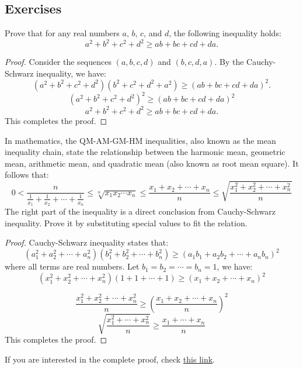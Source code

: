 \documentclass[
	12pt, %
	fleqn, %
	a4paper, %
]{LegrandOrangeBook}
\begin{document}
\subsection{Exercises}
\begin{exercise}
    Prove that for any real numbers \( a \), \( b \), \( c \), and \( d \), the following inequality holds:
    \[
    a^2 + b^2 + c^2 + d^2 \geq ab + bc + cd + da.
    \]
\end{exercise}
\begin{proof}
    Consider the sequences \( (a, b, c, d) \) and \( (b, c, d, a) \). By the Cauchy-Schwarz inequality, we have:
    \[
    (a^2 + b^2 + c^2 + d^2)(b^2 + c^2 + d^2 + a^2) \geq (ab + bc + cd + da)^2.
    \]
    $$\left(a^2+b^2+c^2+d^2\right)^2 \geq (ab + bc + cd + da)^2$$
    \[
    a^2 + b^2 + c^2 + d^2 \geq ab + bc + cd + da.
    \]
    This completes the proof.
\end{proof}
\begin{exercise}
    In mathematics, the QM-AM-GM-HM inequalities, also known as the mean inequality chain, state the relationship between the harmonic mean, geometric mean, arithmetic mean, and quadratic mean (also known as root mean square).
    It follows that:
    \begin{equation}
        0<\frac{n}{\frac{1}{x_{1}}+\frac{1}{x_{2}}+\cdots+\frac{1}{x_{n}}} \leq \sqrt[n]{x_{1} x_{2} \cdots x_{n}} \leq \frac{x_{1}+x_{2}+\cdots+x_{n}}{n} \leq \sqrt{\frac{x_{1}^{2}+x_{2}^{2}+\cdots+x_{n}^{2}}{n}}
    \end{equation}
    The right part of the inequality is a direct conclusion from Cauchy-Schwarz inequality. Prove it by
    substituting special values to fit the relation.
\end{exercise}
\begin{proof}
    Cauchy-Schwarz inequality states that:
    $$\left(a_{1}^{2}+a_{2}^{2}+\cdots+a_{n}^{2}\right)\left(b_{1}^{2}+b_{2}^{2}+\cdots+b_{n}^{2}\right) \geq\left(a_{1} b_{1}+a_{2} b_{2}+\cdots+a_{n} b_{n}\right)^{2}$$
    where all terms are real numbers.
    Let $b_1=b_2=\cdots=b_n=1$, we have:
    $$\left(x_{1}^{2}+x_{2}^{2}+\cdots+x_{n}^{2}\right)(1+1+\cdots+1) \geq\left(x_{1}+x_{2}+\cdots+x_{n}\right)^{2}$$

    $$\frac{x_{1}^{2}+x_{2}^{2}+\cdots+x_{n}^{2}}{n} \geq\left(\frac{x_{1}+x_{2}+\cdots+x_{n}}{n}\right)^{2}$$
    $$\sqrt{\frac{x_{1}^{2}+\cdots+x_{n}^{2}}{n}} \geq \frac{x_{1}+\cdots+x_{n}}{n}$$
    This completes the proof.
\end{proof}
If you are interested in the complete proof, check \href{https://artofproblemsolving.com/wiki/index.php/Root-Mean_Square-Arithmetic_Mean-Geometric_Mean-Harmonic_mean_Inequality}{this link}.
\end{document}

